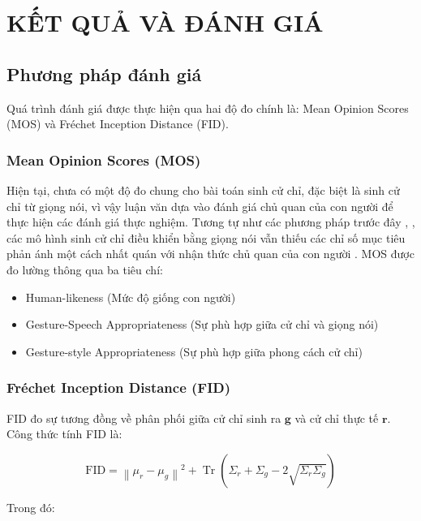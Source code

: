 
\chapter{KẾT QUẢ VÀ ĐÁNH GIÁ}
\label{chap:evalution}

\section{Phương pháp đánh giá}

Quá trình đánh giá được thực hiện qua hai độ đo chính là: Mean Opinion Scores (MOS) và Fréchet Inception Distance (FID).

\subsection{Mean Opinion Scores (MOS)}

Hiện tại, chưa có một độ đo chung cho bài toán sinh cử chỉ, đặc biệt là sinh cử chỉ từ giọng nói, vì vậy luận văn dựa vào đánh giá chủ quan của con người để thực hiện các đánh giá thực nghiệm. 
Tương tự như các phương pháp trước đây \cite{yoon2022genea}, \cite{kucherenko2021large}, các mô hình sinh cử chỉ điều khiển bằng giọng nói vẫn thiếu các chỉ số mục tiêu phản ánh một cách nhất quán với nhận thức chủ quan của con người  \cite{alexanderson2022listen}.
MOS được đo lường thông qua ba tiêu chí:

\begin{itemize}
	\item Human-likeness (Mức độ giống con người)
	\item Gesture-Speech Appropriateness (Sự phù hợp giữa cử chỉ và giọng nói)
	\item Gesture-style Appropriateness (Sự phù hợp giữa phong cách cử chỉ)
\end{itemize}


\subsection{Fréchet Inception Distance (FID)}
FID đo sự tương đồng về phân phối giữa cử chỉ sinh ra $\mathbf{g}$ và cử chỉ thực tế $\mathbf{r}$. Công thức tính FID là:

\begin{equation}
	\text{FID} = \left\| \mu_r - \mu_g \right\|^2 + \operatorname{Tr}\left( \Sigma_r + \Sigma_g - 2 \sqrt{\Sigma_r \Sigma_g} \right)
	\label{eq:fidscore}
\end{equation}


Trong đó:

